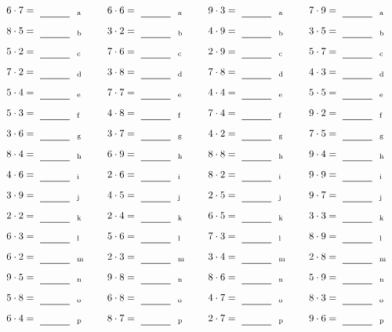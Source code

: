 \documentclass
[
  draft    = true,
  fontsize = 11pt,
  parskip  = half-
]
{scrartcl}
\begin{document}
\par\vfill\par
\begin{align*}
    \pline{6\cdot7}&=\rline{a}
  & \pline{6\cdot6}&=\rline{a}
  & \pline{9\cdot3}&=\rline{a}
  & \pline{7\cdot9}&=\rline{a} \\[1ex]
    \pline{8\cdot5}&=\rline{b}
  & \pline{3\cdot2}&=\rline{b}
  & \pline{4\cdot9}&=\rline{b}
  & \pline{3\cdot5}&=\rline{b} \\[1ex]
    \pline{5\cdot2}&=\rline{c}
  & \pline{7\cdot6}&=\rline{c}
  & \pline{2\cdot9}&=\rline{c}
  & \pline{5\cdot7}&=\rline{c} \\[1ex]
    \pline{7\cdot2}&=\rline{d}
  & \pline{3\cdot8}&=\rline{d}
  & \pline{7\cdot8}&=\rline{d}
  & \pline{4\cdot3}&=\rline{d} \\[1ex]
    \pline{5\cdot4}&=\rline{e}
  & \pline{7\cdot7}&=\rline{e}
  & \pline{4\cdot4}&=\rline{e}
  & \pline{5\cdot5}&=\rline{e} \\[1ex]
    \pline{5\cdot3}&=\rline{f}
  & \pline{4\cdot8}&=\rline{f}
  & \pline{7\cdot4}&=\rline{f}
  & \pline{9\cdot2}&=\rline{f} \\[1ex]
    \pline{3\cdot6}&=\rline{g}
  & \pline{3\cdot7}&=\rline{g}
  & \pline{4\cdot2}&=\rline{g}
  & \pline{7\cdot5}&=\rline{g} \\[1ex]
    \pline{8\cdot4}&=\rline{h}
  & \pline{6\cdot9}&=\rline{h}
  & \pline{8\cdot8}&=\rline{h}
  & \pline{9\cdot4}&=\rline{h} \\[1ex]
    \pline{4\cdot6}&=\rline{i}
  & \pline{2\cdot6}&=\rline{i}
  & \pline{8\cdot2}&=\rline{i}
  & \pline{9\cdot9}&=\rline{i} \\[1ex]
    \pline{3\cdot9}&=\rline{j}
  & \pline{4\cdot5}&=\rline{j}
  & \pline{2\cdot5}&=\rline{j}
  & \pline{9\cdot7}&=\rline{j} \\[1ex]
    \pline{2\cdot2}&=\rline{k}
  & \pline{2\cdot4}&=\rline{k}
  & \pline{6\cdot5}&=\rline{k}
  & \pline{3\cdot3}&=\rline{k} \\[1ex]
    \pline{6\cdot3}&=\rline{l}
  & \pline{5\cdot6}&=\rline{l}
  & \pline{7\cdot3}&=\rline{l}
  & \pline{8\cdot9}&=\rline{l} \\[1ex]
    \pline{6\cdot2}&=\rline{m}
  & \pline{2\cdot3}&=\rline{m}
  & \pline{3\cdot4}&=\rline{m}
  & \pline{2\cdot8}&=\rline{m} \\[1ex]
    \pline{9\cdot5}&=\rline{n}
  & \pline{9\cdot8}&=\rline{n}
  & \pline{8\cdot6}&=\rline{n}
  & \pline{5\cdot9}&=\rline{n} \\[1ex]
    \pline{5\cdot8}&=\rline{o}
  & \pline{6\cdot8}&=\rline{o}
  & \pline{4\cdot7}&=\rline{o}
  & \pline{8\cdot3}&=\rline{o} \\[1ex]
    \pline{6\cdot4}&=\rline{p}
  & \pline{8\cdot7}&=\rline{p}
  & \pline{2\cdot7}&=\rline{p}
  & \pline{9\cdot6}&=\rline{p}
\end{align*}
\end{document}

